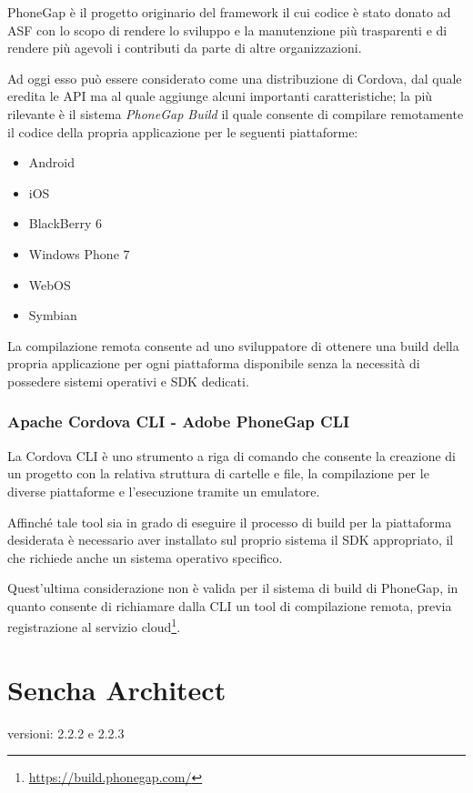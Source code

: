 PhoneGap è il progetto originario del framework il cui codice è stato donato ad \ac{ASF} con lo scopo di rendere lo sviluppo e la manutenzione più trasparenti e di rendere più agevoli i contributi da parte di altre organizzazioni.

Ad oggi esso può essere considerato come una distribuzione di Cordova, dal quale eredita le \ac{API} ma al quale aggiunge alcuni importanti caratteristiche; la più rilevante è il sistema \emph{PhoneGap Build} il quale consente di compilare remotamente il codice della propria applicazione per le seguenti piattaforme:
\begin{itemize}
\item Android
\item iOS
\item BlackBerry 6
\item Windows Phone 7
\item WebOS
\item Symbian
\end{itemize}

La compilazione remota consente ad uno sviluppatore di ottenere una build della propria applicazione per ogni piattaforma disponibile senza la necessità di possedere sistemi operativi e \ac{SDK} dedicati.

\subsubsection{Apache Cordova CLI - Adobe PhoneGap CLI}
La Cordova \ac{CLI} è uno strumento a riga di comando che consente la creazione di un progetto con la relativa struttura di cartelle e file, la compilazione per le diverse piattaforme e l'esecuzione tramite un emulatore.

Affinché tale tool sia in grado di eseguire il processo di build per la piattaforma desiderata è necessario aver installato sul proprio sistema il \ac{SDK} appropriato, il che richiede anche un sistema operativo specifico.

Quest'ultima considerazione non è valida per il sistema di build di PhoneGap, in quanto consente di richiamare dalla \ac{CLI} un tool di compilazione remota, previa registrazione al servizio cloud\footnote{\url{https://build.phonegap.com/}}.

\section{Sencha Architect}
\begin{description}
\item[versioni: 2.2.2 e 2.2.3]
\end{description}

